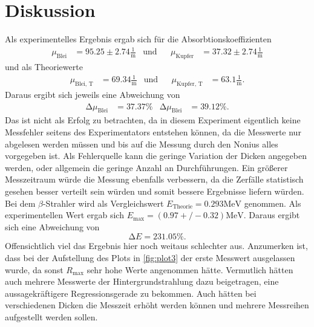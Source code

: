 \section{Diskussion}
\label{sec:Diskussion}

Als experimentelles Ergebnis ergab sich für die Absorbtionskoeffizienten
\begin{align*}
    \mu_\text{Blei} &= 95.25 \pm 2.74 \frac{1}{\unit\meter}&\text{und}&&\mu_\text{Kupfer} &= 37.32 \pm 2.74 \frac{1}{\unit\meter}
\end{align*}
und als Theoriewerte 
\begin{align*}
    \mu_\text{Blei, T} &= 69.34 \frac{1}{\unit\meter}&\text{und}&&\mu_\text{Kupfer, T} &= 63.1 \frac{1}{\unit\meter}.
\end{align*} 
Daraus ergibt sich jeweils eine Abweichung von
\begin{align*}
    \increment \mu_\text{Blei} &= 37.37 \%&\increment \mu_\text{Blei} &= 39.12 \%.
\end{align*}
Das ist nicht als Erfolg zu betrachten, da in diesem Experiment eigentlich keine Messfehler seitens des
Experimentators entstehen können, da die Messwerte nur abgelesen werden müssen und bis auf die Messung durch den Nonius
alles vorgegeben ist.
Als Fehlerquelle kann die geringe Variation der Dicken angegeben werden, oder allgemein die geringe Anzahl an Durchführungen.
Ein größerer Messzeitraum würde die Messung ebenfalls verbessern, da die Zerfälle statistisch gesehen besser verteilt sein würden und somit bessere Ergebnisse liefern würden.\\

Bei dem $\beta$-Strahler wird als Vergleichswert \cite{technetium99} $E_\text{Theorie} = 0.293 \unit{\mega\eV}$ genommen.
Als experimentellen Wert ergab sich $E_\text{max} = (0.97+/-0.32) \unit{\mega\eV}$.
Daraus ergibt sich eine Abweichung von
\begin{equation*}
    \increment E = 231.05 \%.
\end{equation*}
Offensichtlich viel das Ergebnis hier noch weitaus schlechter aus.
Anzumerken ist, dass bei der Aufstellung des Plots in \autoref{fig:plot3} der erste Messwert ausgelassen wurde, da sonst
$R_\text{max}$ sehr hohe Werte angenommen hätte.
Vermutlich hätten auch mehrere Messwerte der Hintergrundstrahlung dazu beigetragen, eine aussagekräftigere Regressionsgerade zu bekommen.
Auch hätten bei verschiedenen Dicken die Messzeit erhöht werden können und mehrere Messreihen aufgestellt werden sollen.
